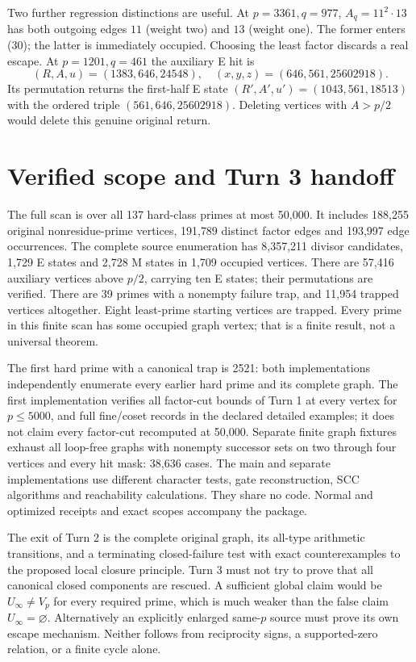 Two further regression distinctions are useful. At $p=3361,q=977$,
$A_q=11^2\cdot13$ has both outgoing edges $11$ (weight two) and $13$ (weight one).
The former enters (30); the latter is immediately occupied. Choosing the least
factor discards a real escape. At $p=1201,q=461$ the auxiliary E hit is
\[
 (R,A,u)=(1383,646,24548),\quad(x,y,z)=(646,561,25602918).
\]
Its permutation returns the first-half E state
$(R',A',u')=(1043,561,18513)$ with the ordered triple $(561,646,25602918)$.
Deleting vertices with $A>p/2$ would delete this genuine original return.

\section{Verified scope and Turn 3 handoff}
The full scan is over all 137 hard-class primes at most 50,000. It includes
188,255 original nonresidue-prime vertices, 191,789 distinct factor edges and
193,997 edge occurrences. The complete source enumeration has 8,357,211
divisor candidates, 1,729 E states and 2,728 M states in 1,709 occupied vertices.
There are 57,416 auxiliary vertices above $p/2$, carrying ten E states; their
permutations are verified. There are 39 primes with a nonempty failure trap,
and 11,954 trapped vertices altogether. Eight least-prime starting vertices
are trapped. Every prime in this finite scan has some occupied graph vertex;
that is a finite result, not a universal theorem.

The first hard prime with a canonical trap is 2521: both implementations
independently enumerate every earlier hard prime and its complete graph.
The first implementation verifies all factor-cut bounds of Turn 1 at every
vertex for $p\le5000$, and full fine/coset records in the declared detailed
examples; it does not claim every factor-cut recomputed at 50,000.
Separate finite graph fixtures exhaust all loop-free graphs with nonempty
successor sets on two through four vertices and every hit mask: 38,636 cases.
The main and separate implementations use different character tests, gate
reconstruction, SCC algorithms and reachability calculations. They share no
code. Normal and optimized receipts and exact scopes accompany the package.

The exit of Turn 2 is the complete original graph, its all-type arithmetic
transitions, and a terminating closed-failure test with exact counterexamples
to the proposed local closure principle. Turn 3 must not try to prove that
all canonical closed components are rescued. A sufficient global claim would
be $U_\infty\ne V_p$ for every required prime, which is much weaker than the
false claim $U_\infty=\varnothing$. Alternatively an explicitly enlarged
same-$p$ source must prove its own escape mechanism. Neither follows from
reciprocity signs, a supported-zero relation, or a finite cycle alone.

